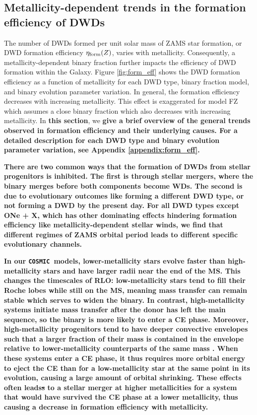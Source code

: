 \documentclass[twocolumn, linenumbers]{aastex631}
\newcommand{\cosmic}{\texttt{COSMIC}}
\begin{document}
\subsection{Metallicity-dependent trends in the formation efficiency of DWDs}\label{sec:formeff}
The number of DWDs formed per unit solar mass of ZAMS star formation, or DWD formation efficiency $\eta_{\rm{form}}(Z)$, varies with metallicity. Consequently, a metallicity-dependent binary fraction further impacts the efficiency of DWD formation within the Galaxy. Figure \ref{fig:form_eff} shows the DWD formation efficiency as a function of metallicity for each DWD type, binary fraction model, and binary evolution parameter variation. In general, the formation efficiency decreases with increasing metallicity. This effect is exaggerated for model FZ which assumes a close binary fraction which also decreases with increasing metallicity. In \textbf{this section}, we \textbf{give a brief overview of the general trends observed in formation efficiency and their underlying causes. For a detailed description for each DWD type and binary evolution parameter variation, see Appendix \ref{appendix:form_eff}.}

\textbf{There are two common ways that the formation of DWDs from stellar progenitors is inhibited. The first is through stellar mergers, where the binary merges before both components become WDs. The second is due to evolutionary outcomes like forming a different DWD type, or not forming a DWD by the present day. For all DWD types except ONe + X, which has other dominating \textbf{effects} hindering formation efficiency like metallicity-dependent stellar winds, we find that different regimes of ZAMS orbital period leads to different specific evolutionary channels.}

\textbf{In our \cosmic\ models, lower-metallicity stars evolve faster than high-metallicity stars and have larger radii near the end of the MS. This changes the timescales of RLO: low-metallicity stars tend to fill their Roche lobes while still on the MS, meaning mass transfer can remain stable which serves to widen the binary. In contrast, high-metallicity systems initiate mass transfer after the donor has left the main sequence, so the binary is more likely to enter a CE phase. Moreover, high-metallicity progenitors tend to have deeper convective envelopes such that a larger fraction of their mass is contained in the envelope relative to lower-metallicity counterparts of the same mass \citep{Amard2019, Amard2020}. When these systems enter a CE phase, it thus requires more orbital energy to eject the CE than for a low-metallicity star at the same point in its evolution, causing a large amount of orbital shrinking. These effects often leads{\sout{s}} to a stellar merger at higher metallicities for a system that would have survived the CE phase at a lower metallicity, thus causing a decrease in formation efficiency with metallicity.} 
\end{document}
